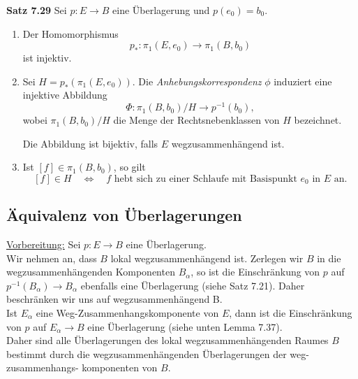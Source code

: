\documentclass[fleqn, 12pt, letterpaper]{article}
\begin{document}
\textbf{Satz 7.29}
Sei \( p : E \to B \) eine Überlagerung und \( p(e_0) = b_0 \).

\begin{enumerate}
  \item Der Homomorphismus
  \[
  p_* : \pi_1(E, e_0) \longrightarrow \pi_1(B, b_0)
  \]
  ist injektiv.

  \item Sei \( H = p_*(\pi_1(E, e_0)) \). Die \emph{Anhebungskorrespondenz} \( \phi \) induziert eine injektive Abbildung
  \[
  \Phi : \pi_1(B, b_0)/H \longrightarrow p^{-1}(b_0),
  \]
  wobei \( \pi_1(B, b_0)/H \) die Menge der Rechtsnebenklassen von \( H \) bezeichnet.

  Die Abbildung ist bijektiv, falls \( E \) wegzusammenhängend ist.

  \item Ist \( [f] \in \pi_1(B, b_0) \), so gilt
  \[
  [f] \in H \quad \Leftrightarrow \quad f \text{ hebt sich zu einer Schlaufe mit Basispunkt } e_0 \text{ in } E \text{ an}.
  \]
\end{enumerate}


\subsection{Äquivalenz von Überlagerungen}

\underline{Vorbereitung:} Sei \( p : E \to B \) eine Überlagerung. \\

Wir nehmen an, dass \( B \) lokal wegzusammenhängend ist. Zerlegen wir \( B \) in die wegzusammenhängenden Komponenten \( B_\alpha \), so ist die Einschränkung von \( p \) auf \( p^{-1}(B_\alpha) \to B_\alpha \) ebenfalls eine Überlagerung (siehe {Satz 7.21}). Daher beschränken wir uns auf wegzusammenhängend B.\\

Ist \( E_\alpha \) eine Weg-Zusammenhangskomponente von \( E \), dann ist die Einschränkung von \( p \) auf \( E_\alpha \to B \) eine Überlagerung (siehe unten Lemma 7.37).\\

Daher sind alle Überlagerungen des lokal wegzusammenhängenden Raumes \( B \) bestimmt durch die wegzusammenhängenden Überlagerungen der weg-zusammenhangs- komponenten von \( B \).
\end{document}

